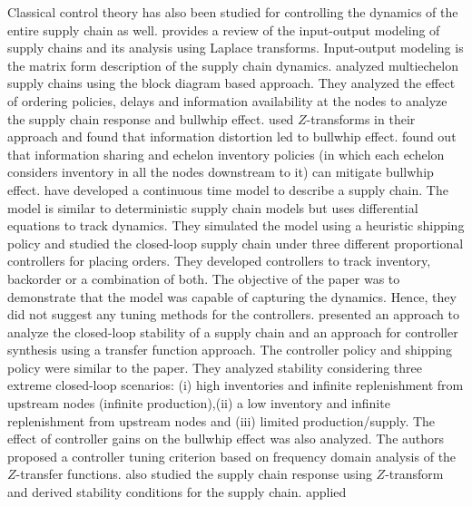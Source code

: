 Classical control theory has also been studied for controlling the
dynamics of the entire supply chain as
well. \citet{grubbstrom:tang:2000} provides a review of the
input-output modeling of supply chains and its analysis using Laplace
transforms. Input-output modeling is the matrix form description of
the supply chain
dynamics. \citet{burns:sivazlian:1978,wikner:towill:naim:1991}
analyzed 
multiechelon supply chains using the block diagram based
approach. They analyzed the effect of ordering policies, delays and
information availability at the nodes to analyze the supply chain
response and bullwhip effect. \citet{burns:sivazlian:1978} used
$Z$-transforms in their approach and found that information distortion
led to bullwhip effect. \citet{wikner:towill:naim:1991} found out that
information sharing and echelon inventory policies (in which each
echelon considers inventory in all the nodes downstream to it) can
mitigate bullwhip effect.
\citet{perealopez:grossmann:ydstie:tahmassebi:2001,
perealopez:grossmann:ydstie:tahmassebi:2000b}
have developed a continuous time model to describe a supply chain. The
model is similar to deterministic supply chain models but uses
differential equations to track dynamics. They simulated the model
using a heuristic shipping policy and studied the closed-loop supply
chain under three different proportional controllers for placing
orders. They developed controllers to track inventory, backorder or a
combination of both. The objective of the
paper was to demonstrate that the model was capable of capturing the
dynamics. Hence, they did not suggest any tuning methods for the
controllers.  \citet{lin:wong:jang:shieh:chu:2004} presented an
approach to analyze the closed-loop stability of a supply chain and an
approach for controller synthesis using a transfer function 
approach. The controller policy and shipping policy were similar to
the \citet{perealopez:grossmann:ydstie:tahmassebi:2001}
paper. They analyzed stability considering three extreme closed-loop
scenarios: (i) high inventories and infinite replenishment from
upstream nodes (infinite production),(ii) a low inventory and infinite
replenishment from upstream nodes and (iii) limited
production/supply. The effect of controller gains on the bullwhip
effect was also analyzed. The authors proposed a controller tuning
criterion based on frequency domain analysis of the $Z$-transfer
functions. \citet{venkateswaran:son:2005} also studied the supply
chain response using $Z$-transform and derived stability conditions
for the supply chain. \citet{hoberg:bradley:thonemann:2007} applied
